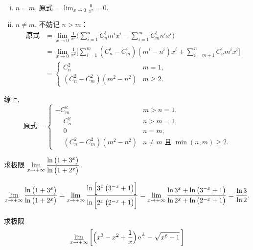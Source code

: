 \begin{solution}
    \begin{enumerate}[i)]
        \item $n=m$, $\displaystyle \text{原式}=\lim_{x\to0}\frac{0}{x^2}=0.$
        \item $n\neq m$, 不妨记 $n>m$：
        \begin{align*}
        \text{原式} 
        &= \lim_{x\to0}\frac{1}{x^2}\Big( \sum_{i=1}^n C_n^i m^i x^i -\sum_{i=1}^m C_m^i n^i x^i \Big) \\
        &= \lim_{x\to0}\frac{1}{x^2}\Big[ \sum_{i=1}^m (C_n^i-C_m^i)(m^i-n^i)x^i + \sum_{i=m+1}^n C_n^i m^i x^i \Big] \\
        &= \begin{cases}
        C_n^2                  & m = 1,  \\
        (C_n^2-C_m^2)(m^2-n^2) & m\geq2.
        \end{cases}
        \end{align*}
    \end{enumerate}
    综上, 
    \[\text{原式}=\begin{cases}
        -C_m^2                 & m>n=1,                           \\
        \phantom{-}C_n^2                  & n>m=1,                           \\
        \phantom{-}0                      & n=m,                             \\
        \phantom{-}(C_n^2-C_m^2)(m^2-n^2) & n\neq m\text{ 且 }\min(n,m)\geq2.
    \end{cases}\]
\end{solution}



\begin{exercise}
    求极限 $\displaystyle \lim_{x\to +\infty}\frac{\ln\del[1]{1+3^x}}{\ln\del[1]{1+2^x}}$.
\end{exercise}

\begin{solution}
    \[
    \lim_{x\to +\infty}\frac{\ln\del[1]{1+3^x}}{\ln\del[1]{1+2^x}} =
    \lim_{x\to +\infty}\frac{\ln\sbr[2]{3^x \del[1]{3^{-x} + 1}}}{\ln\sbr[2]{2^x \del[1]{2^{-x} + 1}}} =
    \lim_{x\to +\infty}\frac{\ln 3^x + \ln\del[1]{3^{-x} + 1}}{\ln 2^x + \ln\del[1]{2^{-x} + 1}} =
    \frac{\ln 3}{\ln 2}.
    \]
\end{solution}


\begin{exercise}
    求极限
    \[\lim_{x \to +\infty} \sbr[3]{\del[2]{x^3 - x^2 + \frac 1x} \mathe^{\frac 1x} - \sqrt{x^6 + 1}\,}\]
\end{exercise}

